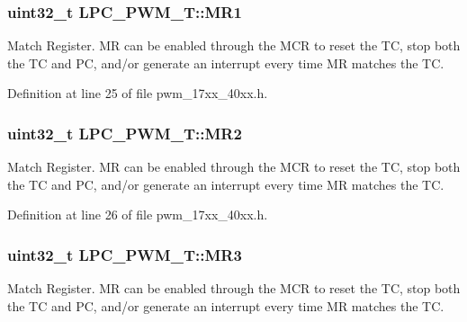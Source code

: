 \subsubsection[{\texorpdfstring{M\+R1}{MR1}}]{ uint32\+\_\+t L\+P\+C\+\_\+\+P\+W\+M\+\_\+\+T\+::\+M\+R1}\hypertarget{structLPC__PWM__T_ae757c05e740e12c63e513c6fab9fffbc}{}\label{structLPC__PWM__T_ae757c05e740e12c63e513c6fab9fffbc}
Match Register. MR can be enabled through the M\+CR to reset the TC, stop both the TC and PC, and/or generate an interrupt every time MR matches the TC. 

Definition at line 25 of file pwm\+\_\+17xx\+\_\+40xx.\+h.

\subsubsection[{\texorpdfstring{M\+R2}{MR2}}]{ uint32\+\_\+t L\+P\+C\+\_\+\+P\+W\+M\+\_\+\+T\+::\+M\+R2}\hypertarget{structLPC__PWM__T_a455e12eec22199d07a9b87195ac74088}{}\label{structLPC__PWM__T_a455e12eec22199d07a9b87195ac74088}
Match Register. MR can be enabled through the M\+CR to reset the TC, stop both the TC and PC, and/or generate an interrupt every time MR matches the TC. 

Definition at line 26 of file pwm\+\_\+17xx\+\_\+40xx.\+h.

\subsubsection[{\texorpdfstring{M\+R3}{MR3}}]{ uint32\+\_\+t L\+P\+C\+\_\+\+P\+W\+M\+\_\+\+T\+::\+M\+R3}\hypertarget{structLPC__PWM__T_a583c387b086f01616e2d8cd8561a9940}{}\label{structLPC__PWM__T_a583c387b086f01616e2d8cd8561a9940}
Match Register. MR can be enabled through the M\+CR to reset the TC, stop both the TC and PC, and/or generate an interrupt every time MR matches the TC. 

